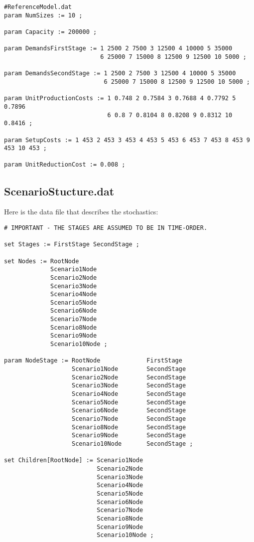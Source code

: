 {\small
\begin{verbatim}
#ReferenceModel.dat
param NumSizes := 10 ;

param Capacity := 200000 ;

param DemandsFirstStage := 1 2500 2 7500 3 12500 4 10000 5 35000
                           6 25000 7 15000 8 12500 9 12500 10 5000 ;

param DemandsSecondStage := 1 2500 2 7500 3 12500 4 10000 5 35000
                            6 25000 7 15000 8 12500 9 12500 10 5000 ;

param UnitProductionCosts := 1 0.748 2 0.7584 3 0.7688 4 0.7792 5 0.7896
                             6 0.8 7 0.8104 8 0.8208 9 0.8312 10 0.8416 ;

param SetupCosts := 1 453 2 453 3 453 4 453 5 453 6 453 7 453 8 453 9 453 10 453 ;

param UnitReductionCost := 0.008 ;
\end{verbatim}

\subsection{ScenarioStucture.dat}

Here is the data file that describes the stochastics:

\begin{verbatim}
# IMPORTANT - THE STAGES ARE ASSUMED TO BE IN TIME-ORDER.

set Stages := FirstStage SecondStage ;

set Nodes := RootNode
             Scenario1Node
             Scenario2Node
             Scenario3Node
             Scenario4Node
             Scenario5Node
             Scenario6Node
             Scenario7Node
             Scenario8Node
             Scenario9Node
             Scenario10Node ;

param NodeStage := RootNode             FirstStage
                   Scenario1Node        SecondStage
                   Scenario2Node        SecondStage
                   Scenario3Node        SecondStage
                   Scenario4Node        SecondStage
                   Scenario5Node        SecondStage
                   Scenario6Node        SecondStage
                   Scenario7Node        SecondStage
                   Scenario8Node        SecondStage
                   Scenario9Node        SecondStage
                   Scenario10Node       SecondStage ;

set Children[RootNode] := Scenario1Node
                          Scenario2Node
                          Scenario3Node
                          Scenario4Node
                          Scenario5Node
                          Scenario6Node
                          Scenario7Node
                          Scenario8Node
                          Scenario9Node
                          Scenario10Node ;


\end{verbatim}}
